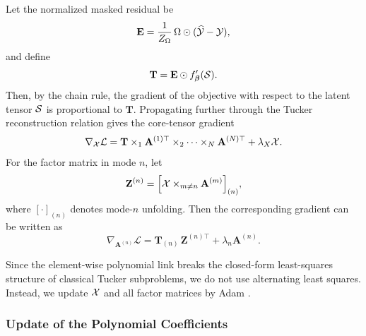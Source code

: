 Let the normalized masked residual be
\begin{equation}
\mathbf E = \frac{1}{Z_\Omega}\,\Omega\odot(\widehat{\mathcal{Y}}-\mathcal{Y}),
\end{equation}
and define
\begin{equation}
\mathbf T = \mathbf E \odot f_{\boldsymbol\beta}'(\mathcal{S}).
\label{eq:T_tensor}
\end{equation}
Then, by the chain rule, the gradient of the objective with respect to the latent tensor $\mathcal{S}$ is proportional to $\mathbf T$. Propagating further through the Tucker reconstruction relation gives the core-tensor gradient
\begin{equation}
\label{eq:grad_core_main}
\nabla_{\mathcal{X}}\mathcal L
=
\mathbf T
\times_1 \mathbf A^{(1)\top}
\times_2 \cdots
\times_N \mathbf A^{(N)\top}
+
\lambda_X\mathcal{X}.
\end{equation}
For the factor matrix in mode $n$, let
\begin{equation}
\label{eq:Zn_def}
\mathbf Z^{(n)}
=
\Bigl[\mathcal{X}\times_{m\neq n}\mathbf A^{(m)}\Bigr]_{(n)},
\end{equation}
where $[\cdot]_{(n)}$ denotes mode-$n$ unfolding. Then the corresponding gradient can be written as
\begin{equation}
\label{eq:grad_factor_main}
\nabla_{\mathbf A^{(n)}}\mathcal L
=
\mathbf T_{(n)}\,\mathbf Z^{(n)\top}
+
\lambda_n\mathbf A^{(n)}.
\end{equation}

Since the element-wise polynomial link breaks the closed-form least-squares structure of classical Tucker subproblems, we do not use alternating least squares. Instead, we update $\mathcal{X}$ and all factor matrices by Adam \cite{kingma2014adam}.

\subsubsection{Update of the Polynomial Coefficients}

